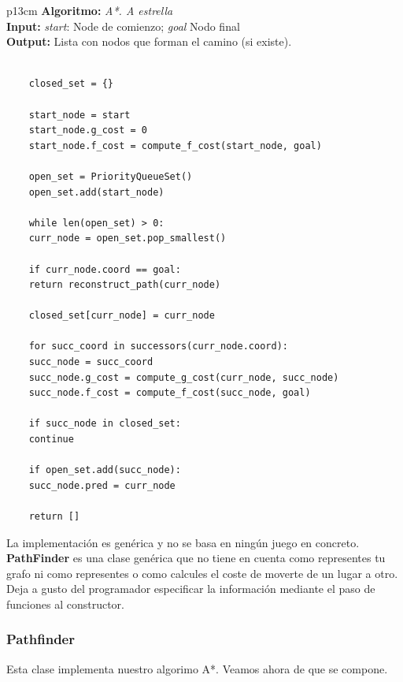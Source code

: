 \documentclass[a4paper,12pt,oneside]{book}
\renewcommand{\baselinestretch}{1.5}
\begin{document}
\begin{tabular}{  p{13cm}  }
  \hline    \hline                    
  {\bf Algoritmo:} {\it A*. A estrella}\\  \hline     
  {\bf Input:} {\it start}: Node de comienzo; {\it goal} Nodo final\\  \hline     
  {\bf Output:} Lista con nodos que forman el camino (si existe).\\  \hline     

  \hline  \hline 
  \renewcommand{\baselinestretch}{1}
  \normalsize
  \begin{lstlisting}

    closed_set = {}
    
    start_node = start
    start_node.g_cost = 0
    start_node.f_cost = compute_f_cost(start_node, goal)
    
    open_set = PriorityQueueSet()
    open_set.add(start_node)
    
    while len(open_set) > 0:
    curr_node = open_set.pop_smallest()
    
    if curr_node.coord == goal:
    return reconstruct_path(curr_node)
    
    closed_set[curr_node] = curr_node
    
    for succ_coord in successors(curr_node.coord):
    succ_node = succ_coord
    succ_node.g_cost = compute_g_cost(curr_node, succ_node)
    succ_node.f_cost = compute_f_cost(succ_node, goal)
    
    if succ_node in closed_set:
    continue
    
    if open_set.add(succ_node):
    succ_node.pred = curr_node
    
    return []

  \end{lstlisting} 
\end{tabular}
\renewcommand{\baselinestretch}{1.5}
\normalsize

La implementación es genérica y no se basa en ningún juego en
concreto. {\bf PathFinder} es una clase genérica que no tiene en
cuenta como representes tu grafo ni como representes o como calcules
el coste de moverte de un lugar a otro. Deja a gusto del programador
especificar la información mediante el paso de funciones al constructor.

\subsubsection{Pathfinder}
Esta clase implementa nuestro algorimo A*. Veamos ahora de que se compone.
\end{document}
